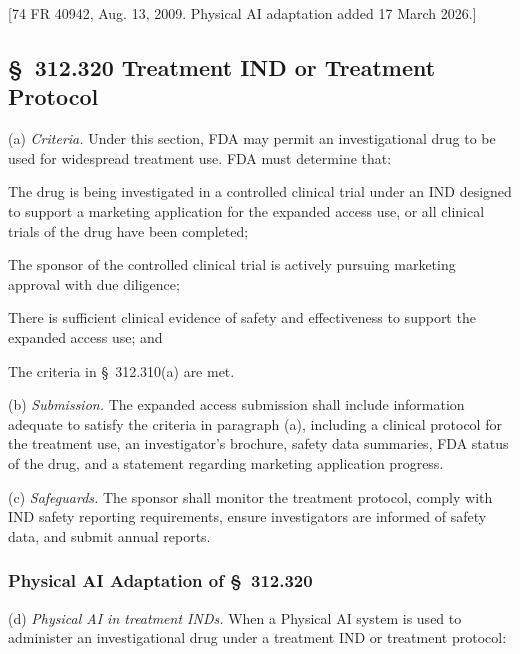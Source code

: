 [74 FR 40942, Aug. 13, 2009. Physical AI adaptation added 17 March 2026.]

\subsection{\S~312.320 Treatment IND or Treatment Protocol}

(a) \textit{Criteria.} Under this section, FDA may permit an investigational drug to be used for widespread treatment use. FDA must determine that:

\begin{description}[leftmargin=0.5cm,style=sameline]
\item[(1)] The drug is being investigated in a controlled clinical trial under an IND designed to support a marketing application for the expanded access use, or all clinical trials of the drug have been completed;
\item[(2)] The sponsor of the controlled clinical trial is actively pursuing marketing approval with due diligence;
\item[(3)] There is sufficient clinical evidence of safety and effectiveness to support the expanded access use; and
\item[(4)] The criteria in \S~312.310(a) are met.
\end{description}

(b) \textit{Submission.} The expanded access submission shall include information adequate to satisfy the criteria in paragraph (a), including a clinical protocol for the treatment use, an investigator's brochure, safety data summaries, FDA status of the drug, and a statement regarding marketing application progress.

(c) \textit{Safeguards.} The sponsor shall monitor the treatment protocol, comply with IND safety reporting requirements, ensure investigators are informed of safety data, and submit annual reports.

\subsubsection{Physical AI Adaptation of \S~312.320}

(d) \textit{Physical AI in treatment INDs.} When a Physical AI system is used to administer an investigational drug under a treatment IND or treatment protocol:

